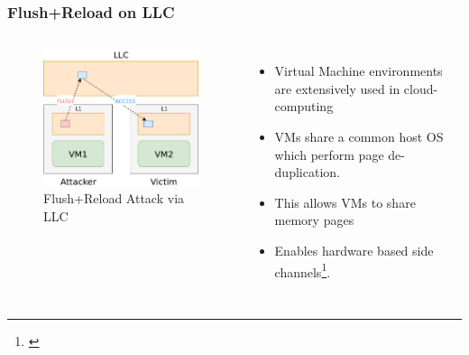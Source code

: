 \documentclass[10pt,usenames,dvipsnames]{beamer}
\begin{document}
\begin{frame}
\frametitle{Flush+Reload on LLC}

\begin{columns}[c]
\begin{figure}
\includegraphics[width=\textwidth]{flush_reload_crossvm}
\caption{Flush+Reload Attack via LLC}
\end{figure}

    \begin{itemize}
        \item Virtual Machine environments are extensively used in cloud-computing
        \item VMs share a common host OS which perform page de-duplication.
        \item This allows VMs to share memory pages
        \item Enables hardware based side channels\footnote[frame]{\cite{cross_vm}}.
    \end{itemize}
\end{columns}
\end{frame}
\end{document}
